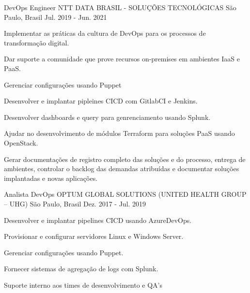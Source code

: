 \begin{cventries}
  \cventry
    {DevOps Engineer} %
    {NTT DATA BRASIL - SOLUÇÕES TECNOLÓGICAS} %
    {São Paulo, Brasil} %
    {Jul. 2019 - Jun. 2021} %
    {
      \begin{cvitems} %
        \item {Implementar as práticas da cultura de DevOps para os processos de transformação digital.}
        \item {Dar suporte a comunidade que prove recursos on-premises em ambientes IaaS e PaaS.}
        \item {Gerenciar configurações usando Puppet}
        \item {Desenvolver e implantar pipleines CICD com GitlabCI e Jenkins.}
        \item {Desenvolver dashboards e query para genrenciamento usando Splunk.}
        \item {Ajudar no desenvolvimento de módulos Terraform para soluções PaaS usando OpenStack.}
        \item {Gerar documentações de registro completo das soluções e do processo, entrega de ambientes, controlar o backlog das demandas atribuídas e documentar soluções implantadas e novas aplicações.}
      \end{cvitems}
    }

  \cventry
    {Analista DevOps} %
    {OPTUM GLOBAL SOLUTIONS (UNITED HEALTH GROUP – UHG)} %
    {São Paulo, Brasil} %
    {Dez. 2017 - Jul. 2019} %
    {
      \begin{cvitems} %
        \item {Desenvolver e implantar pipelines CICD usando AzureDevOps.}
        \item {Provisionar e configurar servidores Linux e Windows Server.}
        \item {Gerenciar configurações usando Puppet.}
        \item {Fornecer sistemas de agregação de logs com Splunk.}
        \item {Suporte interno aos times de desenvolvimento e QA's}
      \end{cvitems}
    }


\end{cventries}